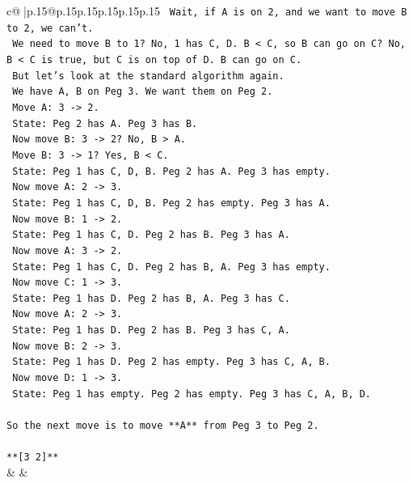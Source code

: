 \documentclass{article}
\begin{document}
{\begin{supertabular}{c@{$\;$}|p{.15\linewidth}@{}p{.15\linewidth}p{.15\linewidth}p{.15\linewidth}p{.15\linewidth}p{.15\linewidth}}
{{{\texttt{   Wait, if A is on 2, and we want to move B to 2, we can't.} \\
\texttt{   We need to move B to 1? No, 1 has C, D. B < C, so B can go on C? No, B < C is true, but C is on top of D. B can go on C.} \\
\texttt{   But let's look at the standard algorithm again.} \\
\texttt{   We have A, B on Peg 3. We want them on Peg 2.} \\
\texttt{   Move A: 3 {-}> 2.} \\
\texttt{   State: Peg 2 has A. Peg 3 has B.} \\
\texttt{   Now move B: 3 {-}> 2? No, B > A.} \\
\texttt{   Move B: 3 {-}> 1? Yes, B < C.} \\
\texttt{   State: Peg 1 has C, D, B. Peg 2 has A. Peg 3 has empty.} \\
\texttt{   Now move A: 2 {-}> 3.} \\
\texttt{   State: Peg 1 has C, D, B. Peg 2 has empty. Peg 3 has A.} \\
\texttt{   Now move B: 1 {-}> 2.} \\
\texttt{   State: Peg 1 has C, D. Peg 2 has B. Peg 3 has A.} \\
\texttt{   Now move A: 3 {-}> 2.} \\
\texttt{   State: Peg 1 has C, D. Peg 2 has B, A. Peg 3 has empty.} \\
\texttt{   Now move C: 1 {-}> 3.} \\
\texttt{   State: Peg 1 has D. Peg 2 has B, A. Peg 3 has C.} \\
\texttt{   Now move A: 2 {-}> 3.} \\
\texttt{   State: Peg 1 has D. Peg 2 has B. Peg 3 has C, A.} \\
\texttt{   Now move B: 2 {-}> 3.} \\
\texttt{   State: Peg 1 has D. Peg 2 has empty. Peg 3 has C, A, B.} \\
\texttt{   Now move D: 1 {-}> 3.} \\
\texttt{   State: Peg 1 has empty. Peg 2 has empty. Peg 3 has C, A, B, D.} \\
\\ 
\texttt{So the next move is to move **A** from Peg 3 to Peg 2.} \\
\\ 
\texttt{**{[}3 2{]}**} \\
            }
        }
    }
    & & \\ \\


\end{supertabular}}
\end{document}
